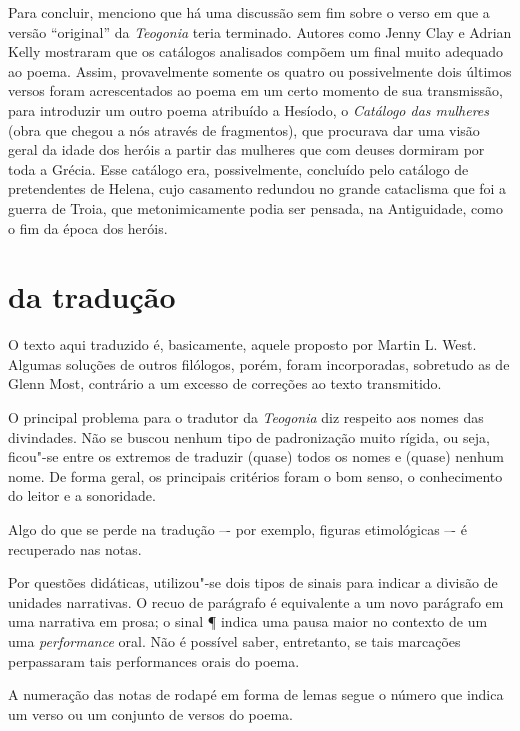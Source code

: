 Para concluir, menciono que há uma discussão sem fim sobre o verso em que a versão
“original” da \textit{Teogonia} teria terminado. Autores como Jenny Clay e
Adrian Kelly mostraram que os catálogos analisados compõem um final muito
adequado ao poema. Assim, provavelmente somente os quatro ou possivelmente dois
últimos versos foram acrescentados ao poema em um certo momento de sua
transmissão, para introduzir um outro poema atribuído a Hesíodo, o
\textit{Catálogo das mulheres} (obra que chegou a nós através de fragmentos),
que procurava dar uma visão geral da idade dos heróis a partir das mulheres que
com deuses dormiram por toda a Grécia. Esse catálogo era, possivelmente,
concluído pelo catálogo de pretendentes de Helena, cujo casamento redundou no
grande cataclisma que foi a guerra de Troia, que metonimicamente podia ser
pensada, na Antiguidade, como o fim da época dos heróis.


 \section{da tradução}
  
  
  O texto aqui traduzido é, basicamente, aquele proposto por Martin L. West.
  Algumas soluções de outros filólogos, porém, foram incorporadas, sobretudo as
  de Glenn Most, contrário a um excesso de correções ao texto transmitido.
  
  O principal problema para o tradutor da \textit{Teogonia} diz respeito aos
  nomes das divindades. Não se buscou nenhum tipo de padronização muito rígida,
  ou seja, ficou"-se entre os extremos de traduzir (quase) todos os nomes e
  (quase) nenhum nome. De forma geral, os principais critérios foram o bom
  senso, o conhecimento do leitor e a sonoridade.
  
  Algo do que se perde na tradução –- por exemplo, figuras etimológicas –- é
  recuperado nas notas.
  
  Por questões didáticas, utilizou"-se dois tipos de sinais para indicar 
  a divisão de unidades narrativas. O recuo de parágrafo é equivalente 
  a um novo parágrafo em uma narrativa
  em prosa; o sinal \P{} indica uma pausa maior no contexto de um
  uma \textit{performance} oral. Não é possível saber, entretanto, se tais
  marcações perpassaram tais performances orais do poema.

  A numeração das notas de rodapé em forma de lemas segue o número 
  que indica um verso ou um conjunto de versos do poema.

